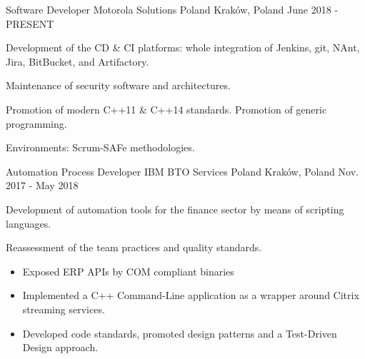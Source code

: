 
\begin{cventries}

\cventry
    {Software Developer} %
    {Motorola Solutions Poland} %
    {Kraków, Poland} %
    {June 2018 - PRESENT} %
    {
        \begin{cvitems} %
            \item {Development of the CD \& CI platforms: whole integration of Jenkins, git, NAnt, Jira, BitBucket, and Artifactory.}
            \item {Maintenance of security software and architectures.}
            \item {Promotion of modern C++11 \& C++14 standards. Promotion of generic programming.}
            \item {Environments: Scrum-SAFe methodologies.}
        \end{cvitems}
    }

\cventry
    {Automation Process Developer} %
    {IBM BTO Services Poland} %
    {Kraków, Poland} %
    {Nov. 2017 - May 2018} %
    {
        \begin{cvitems} %
            \item {Development of automation tools for the finance sector by means of scripting languages.}
            \item {Reassessment of the team practices and quality standards.}
            \begin{itemize}
                \item {Exposed ERP APIs by COM compliant binaries}
                \item {Implemented a C++ Command-Line application as a wrapper around Citrix streaming services.}
                \item {Developed code standards, promoted design patterns and a Test-Driven Design approach.}
            \end{itemize}
        \end{cvitems}
    }


\end{cventries}
